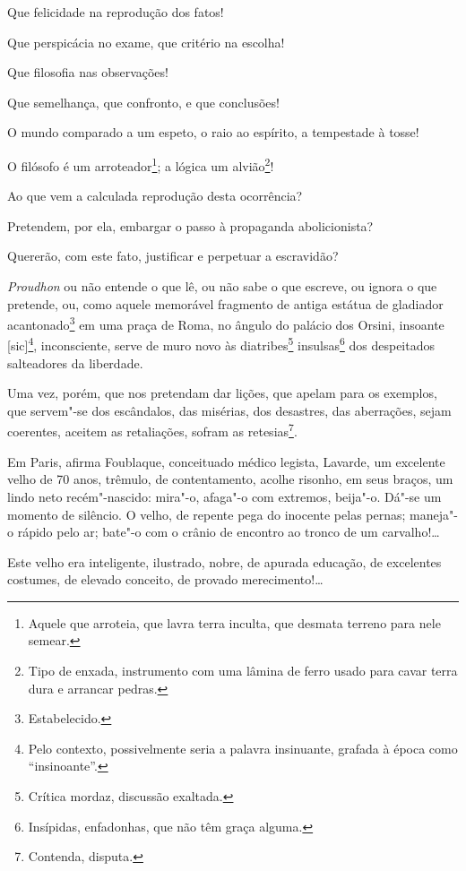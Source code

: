 \asterisc

Que felicidade na reprodução dos fatos!

Que perspicácia no exame, que critério na escolha!

Que filosofia nas observações!

Que semelhança, que confronto, e que conclusões!

O mundo comparado a um espeto, o raio ao espírito, a tempestade à tosse!

O filósofo é um arroteador\footnote{Aquele que arroteia, que lavra
  terra inculta, que desmata terreno para nele semear.}; a lógica um
alvião\footnote{Tipo de enxada, instrumento com uma lâmina de ferro
  usado para cavar terra dura e arrancar pedras.}!

Ao que vem a calculada reprodução desta ocorrência?

Pretendem, por ela, embargar o passo à propaganda abolicionista?

Quererão, com este fato, justificar e perpetuar a escravidão?

\emph{Proudhon} ou não entende o que lê, ou não sabe o que escreve, ou
ignora o que pretende, ou, como aquele memorável fragmento de antiga
estátua de gladiador acantonado\footnote{Estabelecido.} em uma praça
de Roma, no ângulo do palácio dos Orsini, insoante {[}sic{]}\footnote{
  Pelo contexto, possivelmente seria a palavra insinuante, grafada à
  época como ``insinoante''.}, inconsciente, serve de muro novo às
diatribes\footnote{Crítica mordaz, discussão exaltada.}
insulsas\footnote{Insípidas, enfadonhas, que não têm graça alguma.}
dos despeitados salteadores da liberdade.

Uma vez, porém, que nos pretendam dar lições, que apelam para os
exemplos, que servem"-se dos escândalos, das misérias, dos desastres, das
aberrações, sejam coerentes, aceitem as retaliações, sofram as
retesias\footnote{Contenda, disputa.}.

\asterisc

Em Paris, afirma Foublaque, conceituado médico legista, Lavarde, um
excelente velho de 70 anos, trêmulo, de contentamento, acolhe risonho,
em seus braços, um lindo neto recém"-nascido: mira"-o, afaga"-o com
extremos, beija"-o. Dá"-se um momento de silêncio. O velho, de repente
pega do inocente pelas pernas; maneja"-o rápido pelo ar; bate"-o com o
crânio de encontro ao tronco de um carvalho!\ldots{}

Este velho era inteligente, ilustrado, nobre, de apurada educação, de
excelentes costumes, de elevado conceito, de provado merecimento!\ldots{}

